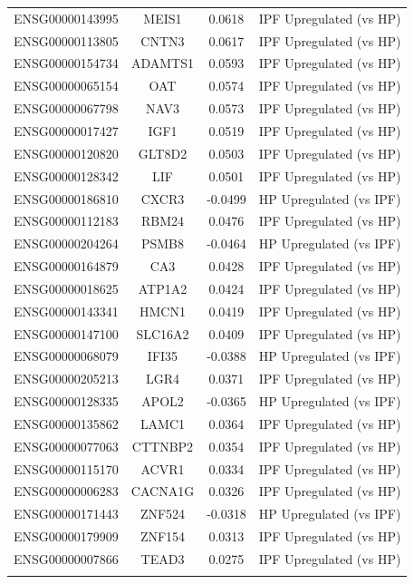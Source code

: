 \documentclass[
]{article}
\begin{document}
\begin{singlespace}
\begin{longtable}[t]{lccc}
ENSG00000143995 & MEIS1 & 0.0618 & IPF Upregulated (vs HP)\\
ENSG00000113805 & CNTN3 & 0.0617 & IPF Upregulated (vs HP)\\
ENSG00000154734 & ADAMTS1 & 0.0593 & IPF Upregulated (vs HP)\\
ENSG00000065154 & OAT & 0.0574 & IPF Upregulated (vs HP)\\
ENSG00000067798 & NAV3 & 0.0573 & IPF Upregulated (vs HP)\\
\addlinespace
ENSG00000017427 & IGF1 & 0.0519 & IPF Upregulated (vs HP)\\
ENSG00000120820 & GLT8D2 & 0.0503 & IPF Upregulated (vs HP)\\
ENSG00000128342 & LIF & 0.0501 & IPF Upregulated (vs HP)\\
ENSG00000186810 & CXCR3 & -0.0499 & HP Upregulated (vs IPF)\\
ENSG00000112183 & RBM24 & 0.0476 & IPF Upregulated (vs HP)\\
\addlinespace
ENSG00000204264 & PSMB8 & -0.0464 & HP Upregulated (vs IPF)\\
ENSG00000164879 & CA3 & 0.0428 & IPF Upregulated (vs HP)\\
ENSG00000018625 & ATP1A2 & 0.0424 & IPF Upregulated (vs HP)\\
ENSG00000143341 & HMCN1 & 0.0419 & IPF Upregulated (vs HP)\\
ENSG00000147100 & SLC16A2 & 0.0409 & IPF Upregulated (vs HP)\\
\addlinespace
ENSG00000068079 & IFI35 & -0.0388 & HP Upregulated (vs IPF)\\
ENSG00000205213 & LGR4 & 0.0371 & IPF Upregulated (vs HP)\\
ENSG00000128335 & APOL2 & -0.0365 & HP Upregulated (vs IPF)\\
ENSG00000135862 & LAMC1 & 0.0364 & IPF Upregulated (vs HP)\\
ENSG00000077063 & CTTNBP2 & 0.0354 & IPF Upregulated (vs HP)\\
\addlinespace
ENSG00000115170 & ACVR1 & 0.0334 & IPF Upregulated (vs HP)\\
ENSG00000006283 & CACNA1G & 0.0326 & IPF Upregulated (vs HP)\\
ENSG00000171443 & ZNF524 & -0.0318 & HP Upregulated (vs IPF)\\
ENSG00000179909 & ZNF154 & 0.0313 & IPF Upregulated (vs HP)\\
ENSG00000007866 & TEAD3 & 0.0275 & IPF Upregulated (vs HP)\\
\addlinespace

\end{longtable}
\end{singlespace}
\end{document}

